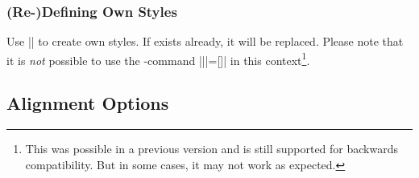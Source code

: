 \subsubsection{(Re-)Defining Own Styles}
\label{sec:styles:own}%
Use ||
to create own styles. If  exists already, it will be replaced. Please note that it is \emph{not} possible to use the \Tikz-command |\tikzstyle||=[]| in this context\footnote{This was possible in a previous version and is still supported for backwards compatibility. But in some cases, it may not work as expected.}.
\begin{codeexample}[]

\end{codeexample}

\subsection{Alignment Options}
\label{pgfplots:sec:align}


